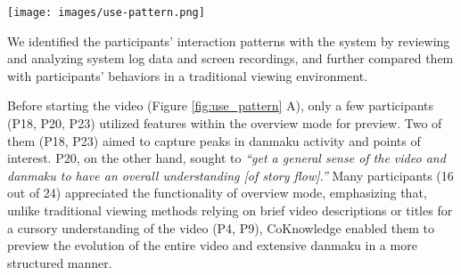 \begin{figure*}[h]
  \centering
  \texttt{[image: images/use-pattern.png]}
  \caption{Usage patterns of CoKnowledge across the stages of before, during, and after viewing. Mode transition timelines represent the average mode usage of participants within each pattern group. Box plots illustrate the quantitative distribution of mode activations and time spent in each mode, with data point shapes indicating the pattern associated with individual participants.}\label{fig:use_pattern}
\end{figure*}

We identified the participants' interaction patterns with the system by reviewing and analyzing system log data and screen recordings, and further compared them with participants' behaviors in a traditional viewing environment.

Before starting the video (Figure \ref{fig:use_pattern} A), only a few participants (P18, P20, P23) utilized features within the overview mode for preview. Two of them (P18, P23) aimed to capture peaks in danmaku activity and points of interest. P20, on the other hand, sought to \textit{``get a general sense of the video and danmaku to have an overall understanding [of story flow].''} Many participants (16 out of 24) appreciated the functionality of overview mode, emphasizing that, unlike traditional viewing methods relying on brief video descriptions or titles for a cursory understanding of the video (P4, P9), CoKnowledge enabled them to preview the evolution of the entire video and extensive danmaku in a more structured manner.

